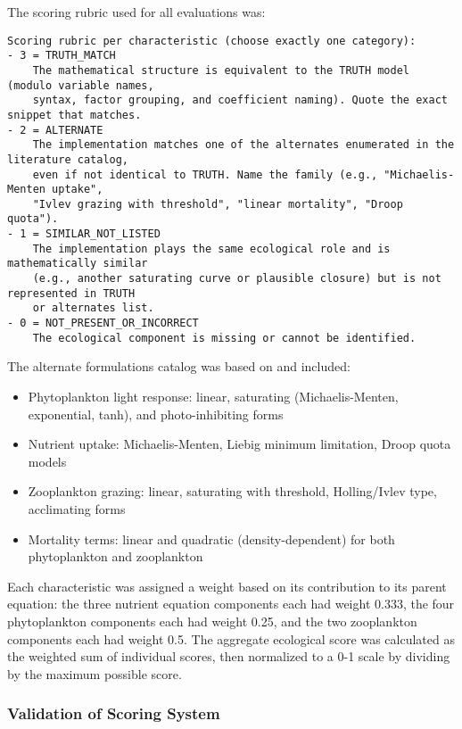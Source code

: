 The scoring rubric used for all evaluations was:

\begin{lstlisting}
Scoring rubric per characteristic (choose exactly one category):
- 3 = TRUTH_MATCH
    The mathematical structure is equivalent to the TRUTH model (modulo variable names,
    syntax, factor grouping, and coefficient naming). Quote the exact snippet that matches.
- 2 = ALTERNATE
    The implementation matches one of the alternates enumerated in the literature catalog,
    even if not identical to TRUTH. Name the family (e.g., "Michaelis-Menten uptake",
    "Ivlev grazing with threshold", "linear mortality", "Droop quota").
- 1 = SIMILAR_NOT_LISTED
    The implementation plays the same ecological role and is mathematically similar
    (e.g., another saturating curve or plausible closure) but is not represented in TRUTH
    or alternates list.
- 0 = NOT_PRESENT_OR_INCORRECT
    The ecological component is missing or cannot be identified.
\end{lstlisting}

The alternate formulations catalog was based on \cite{franks2002npz} and included:

\begin{itemize}
    \item Phytoplankton light response: linear, saturating (Michaelis-Menten, exponential, tanh), and photo-inhibiting forms
    \item Nutrient uptake: Michaelis-Menten, Liebig minimum limitation, Droop quota models
    \item Zooplankton grazing: linear, saturating with threshold, Holling/Ivlev type, acclimating forms
    \item Mortality terms: linear and quadratic (density-dependent) for both phytoplankton and zooplankton
\end{itemize}

Each characteristic was assigned a weight based on its contribution to its parent equation: the three nutrient equation components each had weight 0.333, the four phytoplankton components each had weight 0.25, and the two zooplankton components each had weight 0.5. The aggregate ecological score was calculated as the weighted sum of individual scores, then normalized to a 0-1 scale by dividing by the maximum possible score.

\subsubsection{Validation of Scoring System}

